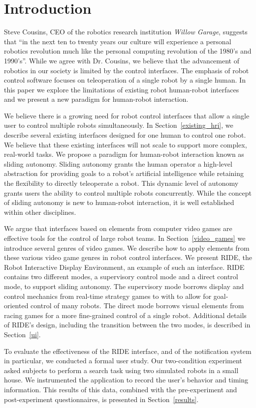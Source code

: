 \chapter{Introduction}
Steve Cousins, CEO of the robotics research institution \emph{Willow Garage}, suggests that ``in the next ten to twenty years our culture will experience a personal robotics revolution much like the personal computing revolution of the 1980's and 1990's''. \cite{Cousins} While we agree with Dr. Cousins, we believe that the advancement of robotics in our society is limited by the control interfaces. The emphasis of robot control software focuses on teleoperation of a single robot by a single human. In this paper we explore the limitations of existing robot human-robot interfaces and we present a new paradigm for human-robot interaction.

We believe there is a growing need for robot control interfaces that allow a single user to control multiple robots simultaneously. In Section~\ref{existing_hri}, we describe several existing interfaces designed for one human to control one robot. We believe that these existing interfaces will not scale to support more complex, real-world tasks. We propose a paradigm for human-robot interaction known as sliding autonomy. Sliding autonomy grants the human operator a high-level abstraction for providing goals to a robot's artificial intelligence while retaining the flexibility to directly teleoperate a robot. This dynamic level of autonomy grants users the ability to control multiple robots concurrently. While the concept of sliding autonomy is new to human-robot interaction, it is well established within other disciplines.

We argue that interfaces based on elements from computer video games are effective tools for the control of large robot teams. In Section~\ref{video_games} we introduce several genres of video games. We describe how to apply elements from these various video game genres in robot control interfaces. We present RIDE, the Robot Interactive Display Environment, an example of such an interface. RIDE contains two different modes, a supervisory control mode and a direct control mode, to support sliding autonomy. The supervisory mode borrows display and control mechanics from real-time strategy games to with to allow for goal-oriented control of many robots. The direct mode borrows visual elements from racing games for a more fine-grained control of a single robot. Additional details of RIDE's design, including the transition between the two modes, is described in Section~\ref{ui}.

To evaluate the effectiveness of the RIDE interface, and of the notification system in particular, we conducted a formal user study. Our two-condition experiment asked subjects to perform a search task using two simulated robots in a small house. We instrumented the application to record the user's behavior and timing information. This results of this data, combined with the pre-experiment and post-experiment questionnaires, is presented in Section~\ref{results}.